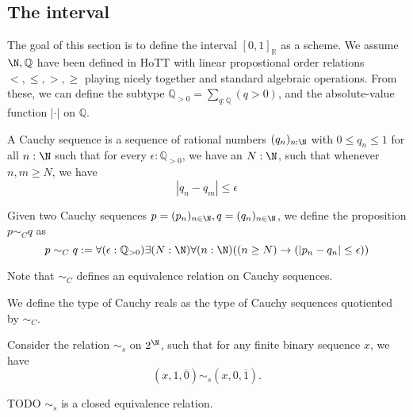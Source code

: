 \newpage
\subsection{The interval}
The goal of this section is to define the interval $[0,1]_\mathbb R$ as a scheme. 
We assume $\N, \mathbb Q$ have been defined in HoTT
with linear propostional order relations $<,\leq, > ,\geq$ playing nicely together 
and standard algebraic operations. 
From these, we can define the subtype $\mathbb Q_{>0}=\sum_{q : \mathbb Q} (q>0)$, 
and the absolute-value function $|\cdot|$ on $\mathbb Q$. 

\begin{definition}
  A Cauchy sequence is a sequence of rational numbers $(q_n)_{n: \N}$ with $0 \leq q_n \leq 1$ 
  for all $n:\N$
  such that for every $\epsilon: \mathbb Q_{>0}$, we have an $N:\N$, 
  such that whenever $n,m \geq N$, we have 
\begin{equation}
  | q_n - q_m | \leq \epsilon
\end{equation} 
\end{definition}

\begin{definition}
Given two Cauchy sequences $p = (p_n)_{n\in\N}, q=(q_n)_{n\in\N}$, 
we define the proposition $p \sim_C  q$ as 
\begin{equation}
  p \sim_C q : = \forall (\epsilon : \mathbb Q_{>0} )\exists ( N :\N) \forall (n : \N) ((n \geq N) \to 
  (| p_n - q_n| \leq  \epsilon))
\end{equation}
\end{definition}
Note that $\sim_C$ defines an equivalence relation on Cauchy sequences. 
\begin{definition}
We define the type of Cauchy reals as the type of Cauchy sequences quotiented by $\sim_C$. 
\end{definition}

%
%
Consider the relation $\sim_s$ on $2^{\N}$, 
such that for any finite binary sequence $x$, we have 
$$(x,1,\overline 0) \sim_s (x ,0, \overline 1).$$
\begin{lemma}
TODO  $\sim_s$ is a closed equivalence relation. 
\end{lemma}



